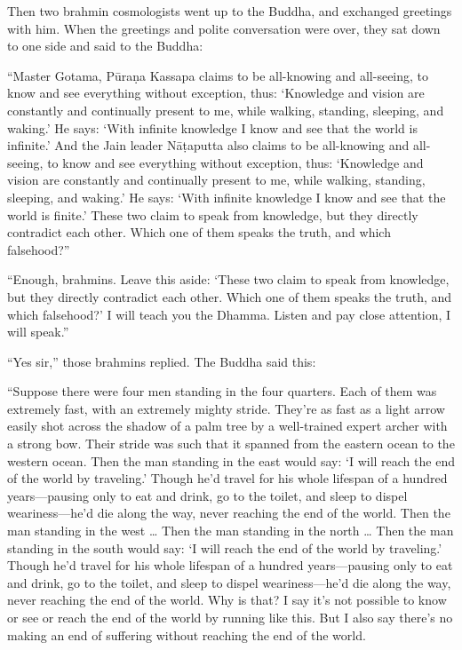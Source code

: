 \documentclass[12pt,openany]{book}%
\begin{document}
Then two brahmin cosmologists went up to the Buddha, and exchanged greetings with him. When the greetings and polite conversation were over, they sat down to one side and said to the Buddha: 

“Master Gotama, \textsanskrit{Pūraṇa} Kassapa claims to be all-knowing and all-seeing, to know and see everything without exception, thus: ‘Knowledge and vision are constantly and continually present to me, while walking, standing, sleeping, and waking.’ He says: ‘With infinite knowledge I know and see that the world is infinite.’ And the Jain leader \textsanskrit{Nāṭaputta} also claims to be all-knowing and all-seeing, to know and see everything without exception, thus: ‘Knowledge and vision are constantly and continually present to me, while walking, standing, sleeping, and waking.’ He says: ‘With infinite knowledge I know and see that the world is finite.’ These two claim to speak from knowledge, but they directly contradict each other. Which one of them speaks the truth, and which falsehood?” 

“Enough, brahmins. Leave this aside: ‘These two claim to speak from knowledge, but they directly contradict each other. Which one of them speaks the truth, and which falsehood?’ I will teach you the Dhamma. Listen and pay close attention, I will speak.” 

“Yes sir,” those brahmins replied. The Buddha said this: 

“Suppose there were four men standing in the four quarters. Each of them was extremely fast, with an extremely mighty stride. They’re as fast as a light arrow easily shot across the shadow of a palm tree by a well-trained expert archer with a strong bow. Their stride was such that it spanned from the eastern ocean to the western ocean. Then the man standing in the east would say: ‘I will reach the end of the world by traveling.’ Though he’d travel for his whole lifespan of a hundred years—pausing only to eat and drink, go to the toilet, and sleep to dispel weariness—he’d die along the way, never reaching the end of the world. Then the man standing in the west … Then the man standing in the north … Then the man standing in the south would say: ‘I will reach the end of the world by traveling.’ Though he’d travel for his whole lifespan of a hundred years—pausing only to eat and drink, go to the toilet, and sleep to dispel weariness—he’d die along the way, never reaching the end of the world. Why is that? I say it’s not possible to know or see or reach the end of the world by running like this. But I also say there’s no making an end of suffering without reaching the end of the world. 
\end{document}
